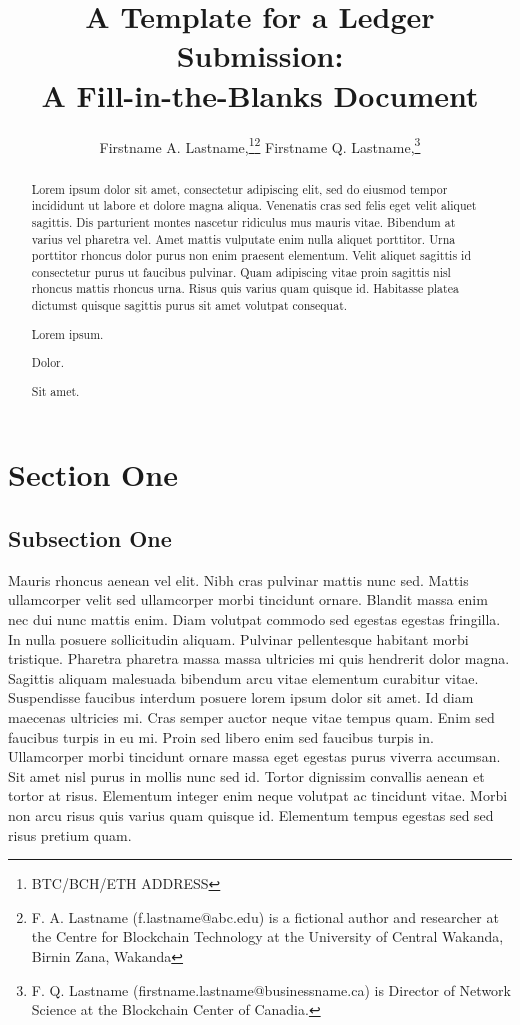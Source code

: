 \documentclass{ledger}
\title{A Template for a Ledger Submission:\\
A Fill-in-the-Blanks Document}
\author{Firstname A. Lastname,\thanks{BTC/BCH/ETH ADDRESS}\thanks{F. A. Lastname (f.lastname@abc.edu) is a fictional author and researcher at the Centre for Blockchain Technology at the University of Central Wakanda, Birnin Zana, Wakanda} Firstname Q. Lastname,\thanks{F. Q. Lastname (firstname.lastname@businessname.ca) is  Director of Network Science at the Blockchain Center of Canadia.}}
\begin{document}
\maketitle

\thispagestyle{pagefirst}

\begin{abstract}
Lorem ipsum dolor sit amet, consectetur adipiscing elit, sed do eiusmod tempor incididunt ut labore et dolore magna aliqua. Venenatis cras sed felis eget velit aliquet sagittis. Dis parturient montes nascetur ridiculus mus mauris vitae. Bibendum at varius vel pharetra vel. Amet mattis vulputate enim nulla aliquet porttitor. Urna porttitor rhoncus dolor purus non enim praesent elementum. Velit aliquet sagittis id consectetur purus ut faucibus pulvinar. Quam adipiscing vitae proin sagittis nisl rhoncus mattis rhoncus urna.\cite{Nakamoto2008} Risus quis varius quam quisque id. Habitasse platea dictumst quisque sagittis purus sit amet volutpat consequat.

\begin{keywords}
\item Lorem ipsum.
\item Dolor.
\item Sit amet.
\end{keywords}
\end{abstract}

\section{Section One}
\subsection{Subsection One}
Mauris rhoncus aenean vel elit.\cite{Smith} Nibh cras pulvinar mattis nunc sed. Mattis ullamcorper velit sed ullamcorper morbi tincidunt ornare. Blandit massa enim nec dui nunc mattis enim. Diam volutpat commodo sed egestas egestas fringilla. In nulla posuere sollicitudin aliquam. Pulvinar pellentesque habitant morbi tristique. Pharetra pharetra massa massa ultricies mi quis hendrerit dolor magna. Sagittis aliquam malesuada bibendum arcu vitae elementum curabitur vitae. Suspendisse faucibus interdum posuere lorem ipsum dolor sit amet. Id diam maecenas ultricies mi. Cras semper auctor neque vitae tempus quam. Enim sed faucibus turpis in eu mi. Proin sed libero enim sed faucibus turpis in. Ullamcorper morbi tincidunt ornare massa eget egestas purus viverra accumsan. Sit amet nisl purus in mollis nunc sed id. Tortor dignissim convallis aenean et tortor at risus. Elementum integer enim neque volutpat ac tincidunt vitae. Morbi non arcu risus quis varius quam quisque id. Elementum tempus egestas sed sed risus pretium quam.
\end{document}

